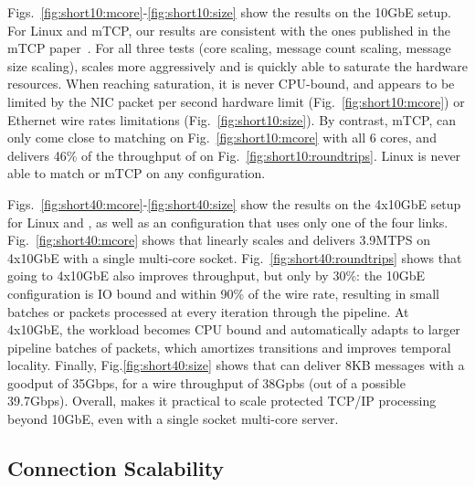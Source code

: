 
Figs.~\ref{fig:short10:mcore}-\ref{fig:short10:size} show the results
on the 10GbE setup.  For Linux and mTCP, our results are consistent
with the ones published in the mTCP paper~\cite{jeong2014mtcp}.  For
all three tests (core scaling, message count scaling, message size
scaling), \ix scales more aggressively and is quickly able to saturate
the hardware resources.  When reaching saturation, it is never
CPU-bound, and appears to be limited by the NIC packet per second
hardware limit (Fig.~\ref{fig:short10:mcore}) or Ethernet wire rates
limitations (Fig.~\ref{fig:short10:size}).  By contrast, mTCP, can
only come close to matching \ix on Fig.~\ref{fig:short10:mcore} with
all 6 cores, and delivers 46\% of the throughput of \ix on
Fig.~\ref{fig:short10:roundtrips}.  Linux is never able to match \ix
or mTCP on any configuration.





Figs.~\ref{fig:short40:mcore}-\ref{fig:short40:size} show the results
on the 4x10GbE setup for Linux and \ix, as well as an \ix
configuration that uses only one of the four
links. Fig.~\ref{fig:short40:mcore} shows that \ix linearly scales and
delivers 3.9MTPS on 4x10GbE with a single multi-core socket.
Fig.~\ref{fig:short40:roundtrips} shows that going to 4x10GbE also
improves throughput, but only by 30\%: the 10GbE configuration is IO
bound and within 90\% of the wire rate, resulting in small batches or
 packets processed at every iteration through the \ix
pipeline.  At 4x10GbE, the workload becomes CPU bound and \ix
automatically adapts to larger pipeline batches of 
packets, which amortizes transitions and improves temporal locality.
Finally, Fig.\ref{fig:short40:size} shows that \ix can deliver 8KB
messages with a goodput of 35Gbps, for a wire throughput of 38Gpbs
(out of a possible 39.7Gbps).  Overall, \ix makes it practical to
scale protected TCP/IP processing beyond 10GbE, even with a single
socket multi-core server.


\subsection{Connection Scalability}

